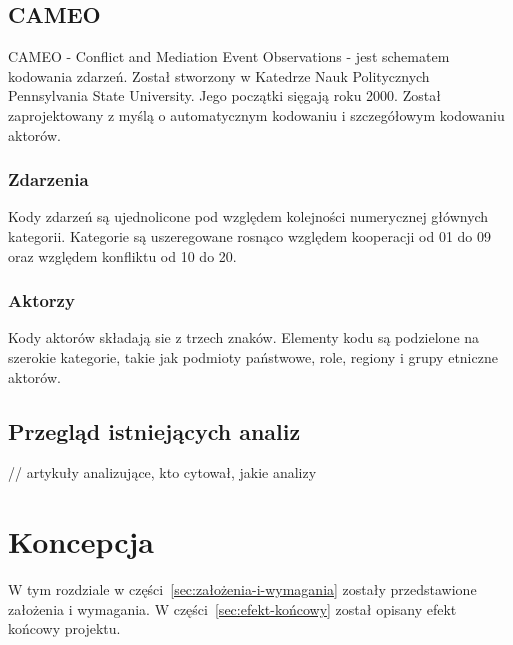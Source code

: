 \documentclass[11pt]{report}
\begin{document}
    \section{CAMEO}\label{sec:cameo}
    CAMEO - Conflict and Mediation Event Observations - jest schematem kodowania zdarzeń.
    Został stworzony w Katedrze Nauk Politycznych Pennsylvania State University.
    Jego początki sięgają roku 2000.
    Został zaprojektowany z myślą o automatycznym kodowaniu i szczegółowym kodowaniu aktorów.

    \subsection{Zdarzenia}
    Kody zdarzeń są ujednolicone pod względem kolejności numerycznej głównych kategorii.
    Kategorie są uszeregowane rosnąco względem kooperacji od 01 do 09 oraz względem konfliktu od 10 do 20.

    \subsection{Aktorzy}
    Kody aktorów składają sie z trzech znaków.
    Elementy kodu są podzielone na szerokie kategorie, takie jak podmioty państwowe, role, regiony i grupy etniczne aktorów.


    \section{Przegląd istniejących analiz} \label{sec:przeglad}
    // artykuły analizujące, kto cytował, jakie analizy


    \chapter{Koncepcja}\label{ch:koncepcja}

    W tym rozdziale w części~\ref{sec:założenia-i-wymagania} zostały przedstawione założenia i wymagania.
    W części~\ref{sec:efekt-końcowy} został opisany efekt końcowy projektu.
\end{document}
